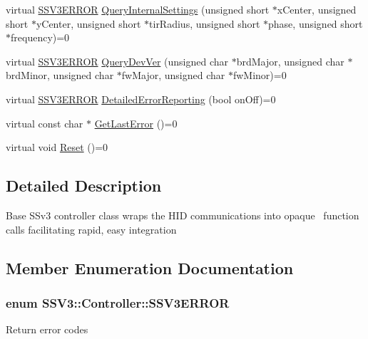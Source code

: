 \begin{DoxyCompactItemize}
\item 
virtual \hyperlink{classSSV3_1_1Controller_a8ff24a92ec373aa1257dcfe2aa2e5406}{S\+S\+V3\+E\+R\+R\+OR} \hyperlink{classSSV3_1_1Controller_a3208aca4a9d3ee6bdf0643b22a1f6e67}{Query\+Internal\+Settings} (unsigned short $\ast$x\+Center, unsigned short $\ast$y\+Center, unsigned short $\ast$tir\+Radius, unsigned short $\ast$phase, unsigned short $\ast$frequency)=0
\item 
virtual \hyperlink{classSSV3_1_1Controller_a8ff24a92ec373aa1257dcfe2aa2e5406}{S\+S\+V3\+E\+R\+R\+OR} \hyperlink{classSSV3_1_1Controller_a52d3025e408a6e502a72c5bb522e3de3}{Query\+Dev\+Ver} (unsigned char $\ast$brd\+Major, unsigned char $\ast$brd\+Minor, unsigned char $\ast$fw\+Major, unsigned char $\ast$fw\+Minor)=0
\item 
virtual \hyperlink{classSSV3_1_1Controller_a8ff24a92ec373aa1257dcfe2aa2e5406}{S\+S\+V3\+E\+R\+R\+OR} \hyperlink{classSSV3_1_1Controller_ab74e7164b2640607140e19a98fc6ac63}{Detailed\+Error\+Reporting} (bool on\+Off)=0
\item 
virtual const char $\ast$ \hyperlink{classSSV3_1_1Controller_a1983242e211ad34cacc91a4e38d42f13}{Get\+Last\+Error} ()=0
\item 
virtual void \hyperlink{classSSV3_1_1Controller_ae3f168a6e03c1bf9dec1df16dd83d113}{Reset} ()=0
\end{DoxyCompactItemize}


\subsection{Detailed Description}
Base S\+Sv3 controller class wraps the H\+ID communications into opaque~\newline
function calls facilitating rapid, easy integration 

\subsection{Member Enumeration Documentation}
\subsubsection[{\texorpdfstring{S\+S\+V3\+E\+R\+R\+OR}{SSV3ERROR}}]{\setlength{\rightskip}{0pt plus 5cm}enum {\bf S\+S\+V3\+::\+Controller\+::\+S\+S\+V3\+E\+R\+R\+OR}\hspace{0.3cm}{\ttfamily [strong]}}\hypertarget{classSSV3_1_1Controller_a8ff24a92ec373aa1257dcfe2aa2e5406}{}\label{classSSV3_1_1Controller_a8ff24a92ec373aa1257dcfe2aa2e5406}
Return error codes 

